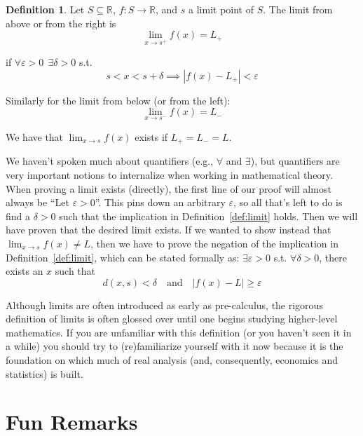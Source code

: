 \documentclass{article}
\theoremstyle{definition}
\newtheorem{definition}{Definition}
\begin{document}
\begin{definition}
  Let $S \subseteq \mathbb{R}$, $f: S \to \mathbb{R}$, and $s$ a limit point of $S$. The limit from above or from the right is
  \begin{equation*}
    \lim_{x \to s^+} f(x) = L_+
  \end{equation*}

  if $\forall \varepsilon > 0 ~~ \exists \delta > 0$ s.t.
  \begin{equation*}
    s < x < s + \delta
    \implies
    |f(x) - L_+| < \varepsilon
  \end{equation*}

  Similarly for the limit from below (or from the left):
  \begin{equation*}
    \lim_{x \to s^-} f(x) = L_-
  \end{equation*}

  We have that $\lim_{x \to s} f(x)$ exists if $L_{+} = L_{-} = L$.
\end{definition}

We haven't spoken much about quantifiers (e.g., $\forall$ and $\exists$), but quantifiers are very important notions to internalize when working in mathematical theory. When proving a limit exists (directly), the first line of our proof will almost always be ``Let $\varepsilon > 0$''. This pins down an arbitrary $\varepsilon$, so all that's left to do is find a $\delta > 0$ such that the implication in Definition~\ref{def:limit} holds. Then we will have proven that the desired limit exists. If we wanted to show instead that $\lim_{x\to s} f(x) \neq L$, then we have to prove the negation of the implication in Definition~\ref{def:limit}, which can be stated formally as: $\exists\varepsilon > 0$ s.t. $\forall\delta>0$, there exists an $x$ such that  
\begin{equation*}
    d(x,s) < \delta \quad\text{and}\quad \left| f(x) - L \right| \geq \varepsilon
\end{equation*}

Although limits are often introduced as early as pre-calculus, the rigorous definition of limits is often glossed over until one begins studying higher-level mathematics. If you are unfamiliar with this definition (or you haven't seen it in a while) you should try to (re)familiarize yourself with it now because it is the foundation on which much of real analysis (and, consequently, economics and statistics) is built. 

\section{Fun Remarks}
\label{sub:fun_remarks}
\end{document}
